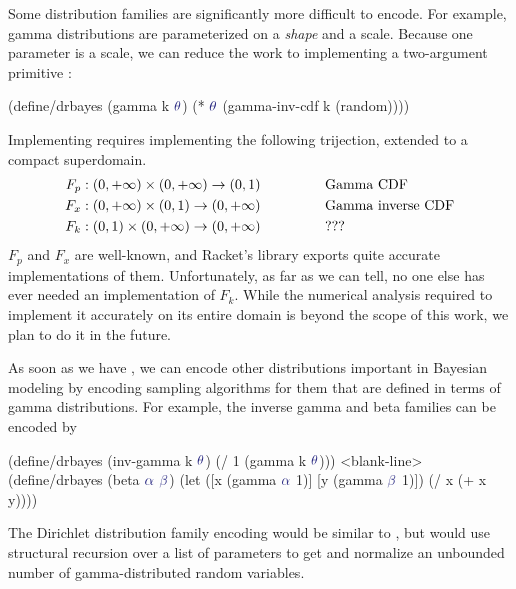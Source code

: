 Some distribution families are significantly more difficult to encode.
For example, gamma distributions are parameterized on a \emph{shape} and a scale.
Because one parameter is a scale, we can reduce the work to implementing a two-argument primitive :
\begin{center}\singlespacing
\begin{schemedisplay}
(define/drbayes (gamma k $\va{\theta}$)
  (* $\va{\theta}$ (gamma-inv-cdf k (random))))
\end{schemedisplay}
\end{center}
Implementing  requires implementing the following trijection, extended to a compact superdomain.
\begin{equation}
\begin{aligned}
	F_p &: (0,{+\infty}) \times (0,{+\infty}) \to (0,1) \hspace{0.5in}&& \text{Gamma CDF} \\
	F_x &: (0,{+\infty}) \times (0,1) \to (0,{+\infty}) && \text{Gamma inverse CDF} \\
	F_k &: (0,1) \times (0,+\infty) \to (0,{+\infty}) && \text{???}
\end{aligned}
\end{equation}
$F_p$ and $F_x$ are well-known, and Racket's  library exports quite accurate implementations of them.
Unfortunately, as far as we can tell, no one else has ever needed an implementation of $F_k$.
While the numerical analysis required to implement it accurately on its entire domain is beyond the scope of this work, we plan to do it in the future.

As soon as we have , we can encode other distributions important in Bayesian modeling by encoding sampling algorithms for them that are defined in terms of gamma distributions.
For example, the inverse gamma and beta families can be encoded by
\begin{center}\singlespacing
\begin{schemedisplay}
(define/drbayes (inv-gamma k $\va{\theta}$)
  (/ 1 (gamma k $\va{\theta}$)))
<blank-line>
(define/drbayes (beta $\va{\alpha}$ $\va{\beta}$)
  (let ([x  (gamma $\va{\alpha}$ 1)]
        [y  (gamma $\va{\beta}$ 1)])
    (/ x (+ x y))))
\end{schemedisplay}
\end{center}
The Dirichlet distribution family encoding would be similar to , but would use structural recursion  over a list of parameters to get and normalize an unbounded number of gamma-distributed random variables.

